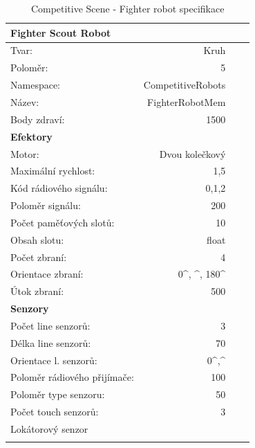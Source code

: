 \par  
\begin{table}[h]\centering
	\begin{tabular}{l@{\hspace{1.0cm}}D{.}{,}{2.2}D{.}{,}{2.2}D{.}{,}{2.3}}
		\toprule
		\textbf{Fighter Scout Robot} \\
		\midrule
		Tvar: & Kruh\\
		Poloměr: & 5\\
		Namespace: & CompetitiveRobots\\
		Název: & FighterRobotMem \\
		Body zdraví: & 1500\\
		\midrule
		\textbf{Efektory} \\
		\midrule
		Motor: & Dvou kolečkový \\
		Maximální rychlost: & 1,5 \\
		Kód rádiového signálu: & 0,1,2\\
		Poloměr signálu: & 200\\
		Počet paměťových slotů: &10 \\
		Obsah slotu: & float\\
		Počet zbraní: & 4\\
		Orientace zbraní: &  0^\circ, ^\circ, 180^\circ\\
		Útok zbraní: & 500\\
		\midrule
		\textbf{Senzory} \\
		\midrule
		Počet line senzorů: &  3\\
		Délka line senzorů: & 70\\
		Orientace l. senzorů: & 0^\circ,^\circ\\
		Poloměr rádiového přijímače: & 100 \\
		Poloměr type senzoru: & 50\\
		Počet touch senzorů: & 3 \\  
		Lokátorový senzor\\ 
		\bottomrule
	\end{tabular}
	\caption{Competitive Scene - Fighter robot specifikace }
	\label{tab04:CompetitiveFighter}
\end{table}
\clearpage
